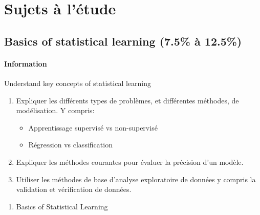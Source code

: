\documentclass[12pt, titlepage, french]{report}
\begin{document}
\part*{Sujets à l'étude}

\chapter[Basics of statistical learning]{Basics of statistical learning (7.5\% à 12.5\%)}

\subsection{Information}

\begin{distributions}[Objective]
Understand key concepts of statistical learning
\end{distributions}

\begin{outcomes}
\begin{enumerate}
	\item	Expliquer les différents types de problèmes, et différentes méthodes, de modélisation. Y compris: 
	\begin{itemize}
		\item	Apprentissage supervisé vs non-supervisé
		\item	Régression vs classification	
	\end{itemize}
	\item	Expliquer les méthodes courantes pour évaluer la précision d'un modèle.
	\item	Utiliser les méthodes de base d'analyse exploratoire de données y compris la validation et vérification de données.
\end{enumerate}
\end{outcomes}

\begin{ASM_chapter}
\begin{enumerate}
	\item	Basics of Statistical Learning
\end{enumerate}
\end{ASM_chapter}
\end{document}
